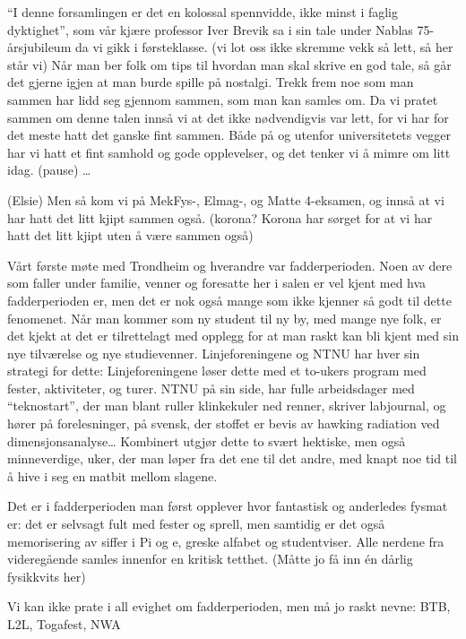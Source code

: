 \documentclass[12pt, a4paper]{scrarticle}
\begin{document}
``I denne forsamlingen er det en kolossal spennvidde, ikke minst i faglig dyktighet'',
som vår kjære professor Iver Brevik sa i sin tale under Nablas 75-årsjubileum da vi gikk i førsteklasse.
(vi lot oss ikke skremme vekk så lett, så her står vi)
Når man ber folk om tips til hvordan man skal skrive en god tale, så går det gjerne igjen at man burde spille på nostalgi.
Trekk frem noe som man sammen har lidd seg gjennom sammen, som man kan samles om.
Da vi pratet sammen om denne talen innså vi at det ikke nødvendigvis var lett, for vi har for det meste hatt det ganske fint sammen.
Både på og utenfor universitetets vegger har vi hatt et fint samhold og gode opplevelser, og det tenker vi å mimre om litt idag.
(pause)
\ldots{}

(Elsie)
Men så kom vi på MekFys-, Elmag-, og Matte 4-eksamen, og innså at vi har hatt det litt kjipt sammen også.
(korona? Korona har sørget for at vi har hatt det litt kjipt uten å være sammen også)

Vårt første møte med Trondheim og hverandre var fadderperioden.
Noen av dere som faller under familie, venner og foresatte her i salen er vel kjent med hva fadderperioden er, men det er nok også mange som ikke kjenner så godt til dette fenomenet.
Når man kommer som ny student til ny by, med mange nye folk, er det kjekt at det er tilrettelagt med opplegg for at man raskt kan bli kjent med sin nye tilværelse og nye studievenner.
Linjeforeningene og NTNU har hver sin strategi for dette:
Linjeforeningene løser dette med et to-ukers program med fester, aktiviteter, og turer.
NTNU på sin side, har fulle arbeidsdager med ``teknostart'', der man blant ruller klinkekuler ned renner, skriver labjournal, og hører på forelesninger, på svensk, der stoffet er bevis av hawking radiation ved dimensjonsanalyse\ldots{}
Kombinert utgjør dette to svært hektiske, men også minneverdige, uker, der man løper fra det ene til det andre, med knapt noe tid til å hive i seg en matbit mellom slagene.

Det er i fadderperioden man først opplever hvor fantastisk og anderledes fysmat er:
det er selvsagt fult med fester og sprell, men samtidig er det også memorisering av siffer i Pi og e, greske alfabet og studentviser.
Alle nerdene fra videregående samles innenfor en kritisk tetthet.
(Måtte jo få inn én dårlig fysikkvits her)

Vi kan ikke prate i all evighet om fadderperioden, men må jo raskt nevne:
BTB, L2L, Togafest, NWA
\end{document}
